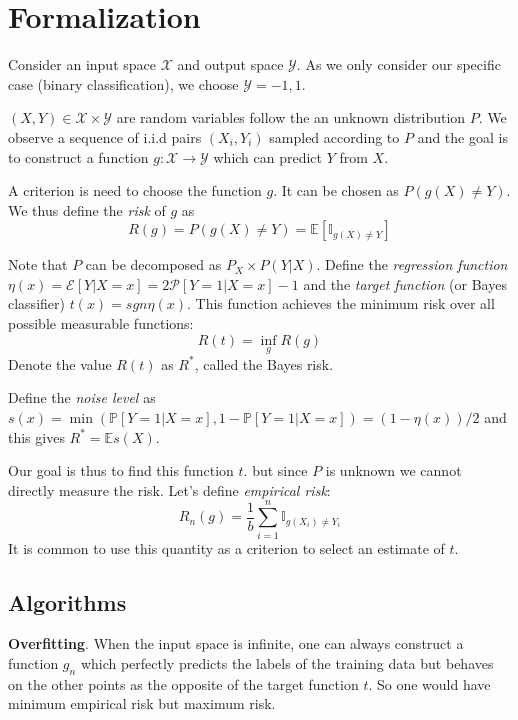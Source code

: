 \documentclass[12pt,reqno]{amsart}
\begin{document}
\section{Formalization}
Consider an input space $\mathcal{X}$ and output space $\mathcal{Y}$. As we only consider our specific case (binary classification), we choose $\mathcal{Y} = {-1, 1}$.

$(X, Y) \in \mathcal{X}\times\mathcal{Y}$
are random variables follow the an unknown distribution $P$.  
We observe a sequence of i.i.d pairs $(X_i, Y_i)$ sampled according to $P$ and the goal is to construct a function
$g: \mathcal{X} \rightarrow \mathcal{Y}$ which can predict
$Y$ from $X$.

A criterion is need to choose the function $g$. It can be
chosen as $P(g(X) \neq Y)$. We thus define the \textit{risk} of $g$ as
\begin{equation}
	R(g) = 	P(g(X) \neq Y) = \mathbb{E}[\mathbb{I}_{g(X)\neq Y}]
\end{equation}

Note that $P$ can be decomposed as $P_X \times P(Y|X)$. Define the \textit{regression function} $\eta(x) = \mathcal{E}[Y|X=x] = 2\mathcal{P}[Y=1|X=x] - 1$ and the
\textit{target function} (or Bayes classifier) $t(x) = sgn \eta(x)$. This function achieves the minimum risk over all
possible measurable functions:
\begin{equation}
	R(t) = \inf_g R(g)
\end{equation}
Denote the value $R(t)$ as $R^*$, called the Bayes risk.

Define the \textit{noise level} as $s(x) = \min(\mathbb{P}[Y=1|X=x], 1 - \mathbb{P}[Y=1|X=x]) = (1-\eta(x))/2$ and this gives $R^* = \mathbb{E}s(X)$.

Our goal is thus to find this function $t$. but since $P$ is unknown we cannot directly measure the risk. Let's define \textit{empirical risk}:
\begin{equation}
	R_n(g) = \frac{1}{b} \sum_{i=1}^n \mathbb{I}_{g(X_i)\neq Y_i}
\end{equation} 
It is common to use this quantity as a criterion to select an estimate of $t$.


\subsection{Algorithms}

\textbf{Overfitting}. When the input space is infinite, one can always construct a function $g_n$ which perfectly predicts the labels of the training data but behaves on the other points as the opposite of the target function $t$. So one would have minimum empirical risk but maximum risk.
\end{document}
